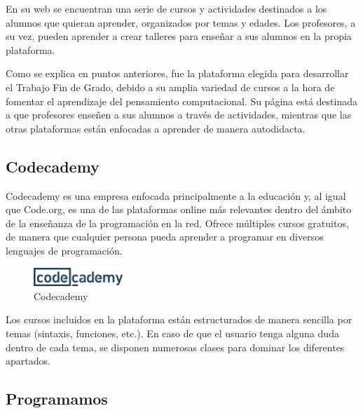 En su web se encuentran una serie de cursos y actividades destinados a los alumnos que quieran aprender, organizados por temas y edades. Los profesores, a su vez, pueden aprender a crear talleres para enseñar a sus alumnos en la propia plataforma.

Como se explica en puntos anteriores, fue la plataforma elegida para desarrollar el Trabajo Fin de Grado, debido a su amplia variedad de cursos a la hora de fomentar el aprendizaje del pensamiento computacional. Su página está destinada a que profesores
enseñen a sus alumnos a través de actividades, mientras que las otras plataformas están enfocadas a aprender de manera autodidacta.


\subsection{Codecademy}
\label{2:sec:3}

Codecademy es una empresa enfocada principalmente a la educación y, al igual que Code.org, es una de las plataformas online más relevantes dentro del ámbito de la enseñanza de la programación en la red. Ofrece múltiples cursos gratuitos, de manera que cualquier
persona pueda aprender a programar en diversos lenguajes de programación.

\begin{figure}[!th]
\begin{center}
\includegraphics[width=0.3\textwidth]{images/captura_codecademy.eps}
\caption{Codecademy}
\label{fig:2}
\end{center}
\end{figure}

Los cursos incluidos en la plataforma están estructurados de manera sencilla por temas (sintaxis, funciones, etc.). En caso de que el usuario tenga alguna duda dentro de cada tema, se disponen numerosas clases para dominar los diferentes apartados.


\subsection{Programamos}
\label{2:sec:4}

